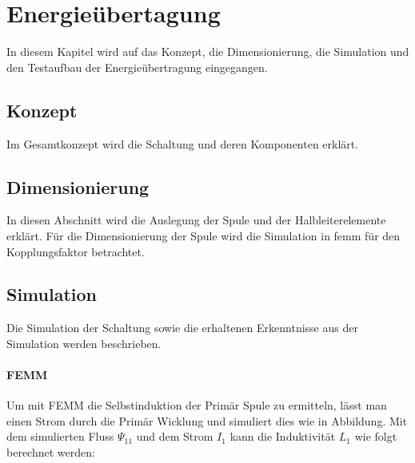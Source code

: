 \section{Energieübertagung}
In diesem Kapitel wird auf das Konzept, die Dimensionierung, die Simulation und den Testaufbau der Energieübertragung eingegangen.

\subsection{Konzept}
Im Gesamtkonzept wird die Schaltung und deren Komponenten erklärt. 

\subsection{Dimensionierung}
In diesen Abschnitt wird die Auslegung der Spule und der Halbleiterelemente erklärt. Für die Dimensionierung der Spule wird die Simulation in femm für den Kopplungsfaktor betrachtet. 






\subsection{Simulation}
Die Simulation der Schaltung sowie die erhaltenen Erkenntnisse aus der Simulation werden beschrieben.  

\paragraph{FEMM}




Um mit FEMM die Selbstinduktion der Primär Spule zu ermitteln, lässt man einen Strom durch die Primär Wicklung und simuliert dies wie in Abbildung. Mit dem simulierten Fluss $ \Psi_{11}  $ und dem Strom $ I_{1} $ kann die Induktivität $ L_{1} $ wie folgt berechnet werden:

